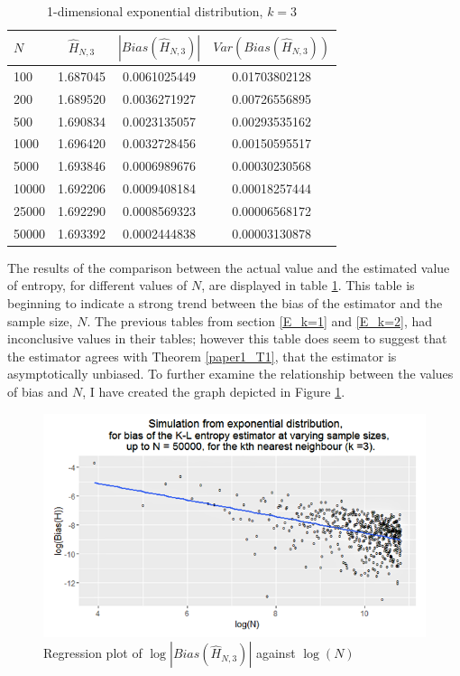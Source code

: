 \documentclass{article}
\begin{document}
\begin{table}
\caption{1-dimensional exponential distribution, $k=3$} \label{expo_k=3_table}
\begin{center}
\begin{tabular}{| l | c c c|} 
\toprule
$N$ & $\hat{H}_{N, 3}$ & $|Bias(\hat{H}_{N, 3})|$ & $Var(Bias(\hat{H}_{N, 3}))$ \\
\midrule[1pt]
100     & 1.687045     & 0.0061025449     & 0.01703802128  \\
200     & 1.689520     & 0.0036271927     & 0.00726556895  \\
500     & 1.690834     & 0.0023135057     & 0.00293535162  \\
1000    & 1.696420     & 0.0032728456     & 0.00150595517  \\
5000    & 1.693846     & 0.0006989676     & 0.00030230568  \\
10000   & 1.692206     & 0.0009408184     & 0.00018257444  \\
25000   & 1.692290     & 0.0008569323     & 0.00006568172  \\
50000   & 1.693392     & 0.0002444838     & 0.00003130878  \\
\hline
\end{tabular}
\end{center}
\end{table}

The results of the comparison between the actual value and the estimated value of entropy, for different values of $N$, are displayed in table \ref{expo_k=3_table}. This table is beginning to indicate a strong trend between the bias of the estimator and the sample size, $N$. The previous tables from section \ref{E_k=1} and \ref{E_k=2}, had inconclusive values in their tables; however this table does seem to suggest that the estimator agrees with Theorem \ref{paper1_T1}, that the estimator is asymptotically unbiased. To further examine the relationship between the values of bias and $N$, I have created the graph depicted in Figure \ref{expo_k=3_graph}.

\begin{figure}
  \begin{center}
    \includegraphics[width=\textwidth]{./Graphs/Expo_k=3_plot2.png}
  \end{center}
\caption{Regression plot of $\log|Bias(\hat{H}_{N, 3})|$ against $\log(N)$}
  \label{expo_k=3_graph}
\end{figure}
\end{document}
